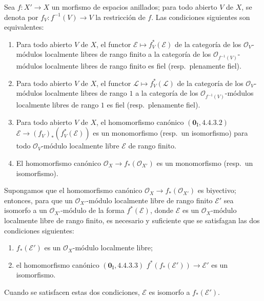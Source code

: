 \begin{lemma}[21.13.2]
\label{IV.21.13.2}
Sea $f:X'\to X$ un morfismo de espacios anillados; para todo abierto $V$ de $X$,
se denota por $f_V:f^{-1}(V)\to V$ la restricción de $f$. Las condiciones siguientes son
equivalentes:
\begin{enumerate}[label=\emph{\alph*)}]
  \item Para todo abierto $V$ de $X$, el functor
  $\mathscr E\mapsto f_V^*(\mathscr E)$ de la categoría de los $\mathcal O_V$-módulos
  localmente libres de rango finito a la categoría de los
  $\mathcal O_{f^{-1}(V)}$-módulos localmente libres de rango finito es fiel
  \textup{(resp.}\ plenamente fiel\textup{)}.
  \item[\emph{a')}] Para todo abierto $V$ de $X$, el functor
  $\mathscr L\mapsto f_V^*(\mathscr L)$ de la categoría de los $\mathcal O_V$-módulos
  localmente libres de rango $1$ a la categoría de los
  $\mathcal O_{f^{-1}(V)}$-módulos localmente libres de rango $1$ es fiel
  \textup{(resp.}\ plenamente fiel\textup{)}.
  \item Para todo abierto $V$ de $X$, el homomorfismo canónico
  $(\mathbf 0_{\mathrm I}, 4.4.3.2)$
  $\mathscr E\to(f_V)_*(f_V^*(\mathscr E))$ es un monomorfismo
  \textup{(resp.}\ un isomorfismo\textup{)} para todo $\mathcal O_V$-módulo localmente libre
  $\mathscr E$ de rango finito.
  \item[\emph{b')}] El homomorfismo canónico
  $\mathcal O_X\to f_*(\mathcal O_{X'})$ es un monomorfismo
  \textup{(resp.}\ un isomorfismo\textup{)}.
\end{enumerate}

Supongamos que el homomorfismo canónico $\mathcal O_X\to f_*(\mathcal O_{X'})$ es
biyectivo; entonces, para que un $\mathcal O_{X'}$-módulo localmente libre de rango finito
$\mathscr E'$ sea isomorfo a un $\mathcal O_{X'}$-módulo de la forma
$f^*(\mathscr E)$, donde $\mathscr E$ es un $\mathcal O_X$-módulo localmente libre de
rango finito, es necesario y suficiente que se satisfagan las dos condiciones siguientes:
\begin{enumerate}[label=\textup{(\roman*)}]
  \item $f_*(\mathscr E')$ es un $\mathcal O_X$-módulo localmente libre;
  \item el homomorfismo canónico $(\mathbf 0_{\mathrm I}, 4.4.3.3)$
  $f^*(f_*(\mathscr E'))\to\mathscr E'$ es un isomorfismo.
\end{enumerate}
Cuando se satisfacen estas dos condiciones, $\mathscr E$ es isomorfo a
$f_*(\mathscr E')$.
\end{lemma}

